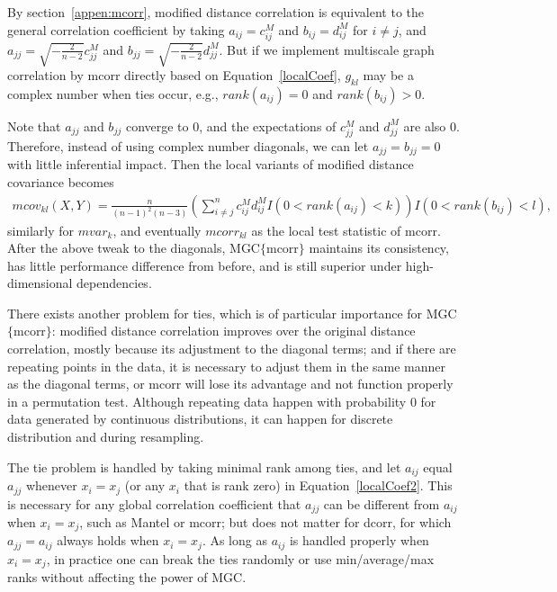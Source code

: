 \documentclass[11pt]{article}
\begin{document}
By section~\ref{appen:mcorr}, modified distance correlation is equivalent to the general correlation coefficient by taking $a_{ij}=c^{M}_{ij}$ and $b_{ij}=d^{M}_{ij}$ for $i \neq j$, and $a_{jj}=\sqrt{-\frac{2}{n-2}}c^{M}_{jj}$ and $b_{jj}=\sqrt{-\frac{2}{n-2}}d^{M}_{jj}$. But if we implement multiscale graph correlation by mcorr directly based on Equation~\ref{localCoef}, $g_{kl}$ may be a complex number when ties occur, e.g., $rank(a_{ij})=0$ and $rank(b_{ij})>0$.

Note that $a_{jj}$ and $b_{jj}$ converge to $0$, and the expectations of $c^{M}_{jj}$ and $d^{M}_{jj}$ are also $0$. Therefore, instead of using complex number diagonals, we can let $a_{jj}=b_{jj}=0$ with little inferential impact. Then the local variants of modified distance covariance becomes
\begin{align*}
mcov_{kl}(X,Y) = \frac{n}{(n-1)^2(n-3)}(\sum_{i \neq j}^{n}c^{M}_{ij}d^{M}_{ij}I(0<rank(a_{ij})<k))I(0<rank(b_{ij})<l),
\end{align*}
similarly for $mvar_{k}$, and eventually $mcorr_{kl}$ as the local test statistic of mcorr. After the above tweak to the diagonals, MGC$\{$mcorr$\}$ maintains its consistency, has little performance difference from before, and is still superior under high-dimensional dependencies.

There exists another problem for ties, which is of particular importance for MGC$\{$mcorr$\}$: modified distance correlation improves over the original distance correlation, mostly because its adjustment to the diagonal terms; and if there are repeating points in the data, it is necessary to adjust them in the same manner as the diagonal terms, or mcorr will lose its advantage and not function properly in a permutation test. Although repeating data happen with probability $0$ for data generated by continuous distributions, it can happen for discrete distribution and during resampling.

The tie problem is handled by taking minimal rank among ties, and let $a_{ij}$ equal $a_{jj}$ whenever $x_{i}=x_{j}$ (or any $x_{i}$ that is rank zero) in Equation~\ref{localCoef2}. This is necessary for any global correlation coefficient that $a_{jj}$ can be different from $a_{ij}$ when $x_{i}=x_{j}$, such as Mantel or mcorr; but does not matter for dcorr, for which $a_{jj}=a_{ij}$ always holds when $x_{i}=x_{j}$. As long as $a_{ij}$ is handled properly when $x_{i}=x_{j}$, in practice one can break the ties randomly or use min/average/max ranks without affecting the power of MGC.
\end{document}

